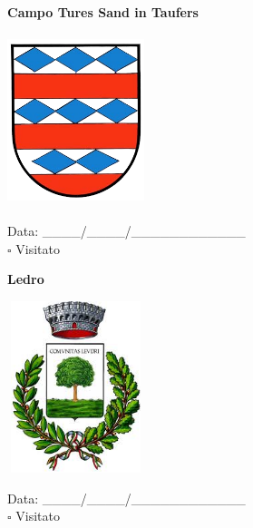 \documentclass[a5paper,12pt]{article}
\begin{document}
\vspace{0.7cm}

\noindent
\begin{minipage}[t]{0.45\textwidth}
    \begin{center}
        \textbf{Campo Tures Sand in Taufers}
    \end{center}
    \vspace{-0.5cm} %
    \begin{center}
        \includegraphics[height= 5cm, width=4cm]{Trentino Alto Adige/Stemma Campo Tures Sand in Taufers.png}
    \end{center}
    \vspace{-0.4cm} %
    \begin{flushleft}
        Data: \_\_\_\_/\_\_\_\_/\_\_\_\_\_\_\_\_\_\_\_\_ \\
        $\square$ Visitato
    \end{flushleft}
\end{minipage}
\hfill
\noindent
\begin{minipage}[t]{0.45\textwidth}
    \begin{center}
        \textbf{Ledro}
    \end{center}
    \vspace{-0.5cm} %
    \begin{center}
        \includegraphics[height= 5cm, width=4cm]{Trentino Alto Adige/Stemma Ledro.jpg}
    \end{center}
    \vspace{-0.4cm} %
    \begin{flushleft}
        Data: \_\_\_\_/\_\_\_\_/\_\_\_\_\_\_\_\_\_\_\_\_ \\
        $\square$ Visitato
    \end{flushleft}
\end{minipage}
\end{document}

